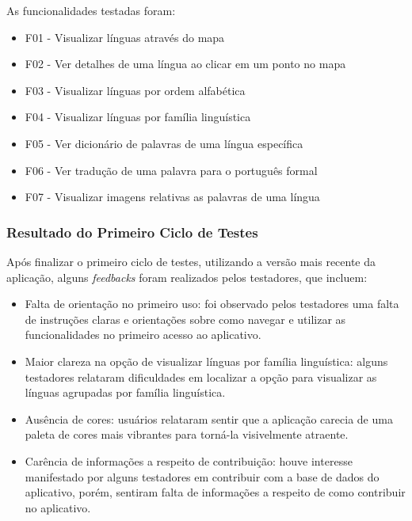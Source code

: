 \begin{description}
    \item As funcionalidades testadas foram:
	\begin{itemize}
		\item F01 - Visualizar línguas através do mapa
		\item F02 - Ver detalhes de uma língua ao clicar em um ponto no mapa
		\item F03 - Visualizar línguas por ordem alfabética
		\item F04 - Visualizar línguas por família linguística
		\item F05 - Ver dicionário de palavras de uma língua específica
		\item F06 - Ver tradução de uma palavra para o português formal
		\item F07 - Visualizar imagens relativas as palavras de uma língua
	\end{itemize}
\end{description}

\subsubsection{Resultado do Primeiro Ciclo de Testes}
\label{sec:Resultado do Primeiro Ciclo de Testes}
Após finalizar o primeiro ciclo de testes, utilizando a versão mais recente da aplicação, alguns \textit{feedbacks} foram realizados pelos testadores, que incluem:

\begin{itemize}
	\item Falta de orientação no primeiro uso: foi observado pelos testadores uma falta de instruções claras e orientações sobre como navegar e utilizar as funcionalidades no primeiro acesso ao aplicativo.
	\item Maior clareza na opção de visualizar línguas por família linguística: alguns testadores relataram dificuldades em localizar a opção para visualizar as línguas agrupadas por família linguística.
	\item Ausência de cores: usuários relataram sentir que a aplicação carecia de uma paleta de cores mais vibrantes para torná-la visivelmente atraente.
	\item Carência de informações a respeito de contribuição: houve interesse manifestado por alguns testadores em contribuir com a base de dados do aplicativo, porém, sentiram falta de informações a respeito 
	de como contribuir no aplicativo.
\end{itemize}

